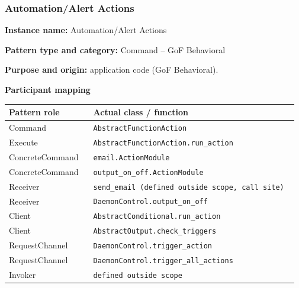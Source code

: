 \documentclass[11pt,a4paper]{article}
\newcommand{\field}[2]{\textbf{#1:} #2\par}
\begin{document}
\subsubsection{Automation/Alert Actions}
\field{Instance name}{Automation/Alert Actions}
\field{Pattern type and category}{Command -- GoF Behavioral}
\field{Purpose and origin}{application code (GoF Behavioral).}
\textbf{Participant mapping}\par
{\small\setlength{\tabcolsep}{3pt}
\begin{longtable}{@{}P{0.29\linewidth}P{0.68\linewidth}@{}}\toprule
\textbf{Pattern role} & \textbf{Actual class / function} \\ \midrule\endhead
Command & \texttt{AbstractFunctionAction} \\
Execute & \texttt{AbstractFunctionAction.\allowbreak{}run\_\allowbreak{}action} \\
ConcreteCommand & \texttt{email.\allowbreak{}ActionModule} \\
ConcreteCommand & \texttt{output\_\allowbreak{}on\_\allowbreak{}off.\allowbreak{}ActionModule} \\
Receiver & \texttt{send\_\allowbreak{}email (defined outside scope, call site)} \\
Receiver & \texttt{DaemonControl.\allowbreak{}output\_\allowbreak{}on\_\allowbreak{}off} \\
Client & \texttt{AbstractConditional.\allowbreak{}run\_\allowbreak{}action} \\
Client & \texttt{AbstractOutput.\allowbreak{}check\_\allowbreak{}triggers} \\
RequestChannel & \texttt{DaemonControl.\allowbreak{}trigger\_\allowbreak{}action} \\
RequestChannel & \texttt{DaemonControl.\allowbreak{}trigger\_\allowbreak{}all\_\allowbreak{}actions} \\
Invoker & \texttt{defined outside scope} \\
\bottomrule\end{longtable}}
\end{document}
